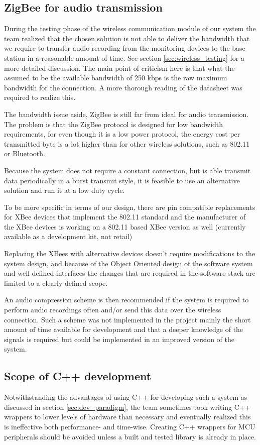 \subsection{ZigBee for audio transmission}
During the testing phase of the wireless communication module of our system the team realized that the chosen solution is not able to deliver the bandwidth that we require to transfer audio recording from the monitoring devices to the base station in a reasonable amount of time. See section \ref{sec:wireless_testing} for a more detailed discussion. The main point of criticism here is that what the assumed to be the available bandwidth of 250 kbps is the raw maximum bandwidth for the connection. A more thorough reading of the datasheet was required to realize this.

The bandwidth issue aside, ZigBee is still far from ideal for audio transmission. The problem is that the ZigBee protocol is designed for low bandwidth requirements, for even though it is a low power protocol, the energy cost per transmitted byte is a lot higher than for other wireless solutions, such as 802.11 or Bluetooth. 

Because the system does not require a constant connection, but is able transmit data periodically in a burst transmit style, it is feasible to use an alternative solution and run it at a low duty cycle. 

To be more specific in terms of our design, there are pin compatible replacements for XBee devices that implement the 802.11 standard and the manufacturer of the XBee devices is working on a 802.11 based XBee version as well (currently available as a development kit, not retail)

Replacing the XBees with alternative devices doesn’t require modifications to the system design, and because of the Object Oriented design of the software system and well defined interfaces the changes that are required in the software stack are limited to a clearly defined scope.

An audio compression scheme is then recommended if the system is required to perform audio recordings often and/or send this data over the wireless connection. Such a scheme was not implemented in the project mainly the short amount of time available for development and that a deeper knowledge of the signals is required but could be implemented in an improved version of the system.

\subsection{Scope of C++ development}
Notwithstanding the advantages of using C++ for developing such a system as discussed in section \ref{sec:dev_paradigm}, the team sometimes took writing C++ wrappers to lower levels of hardware than necessary and eventually realized this is ineffective both performance- and time-wise. Creating C++ wrappers for MCU peripherals should be avoided unless a built and tested library is already in place.

